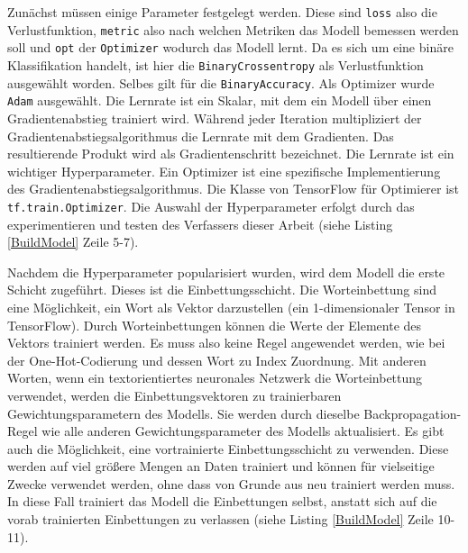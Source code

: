 Zunächst müssen einige Parameter festgelegt werden. Diese sind \texttt{loss} also die Verlustfunktion, \texttt{metric} also nach welchen Metriken das Modell bemessen werden soll und \texttt{opt} der \texttt{Optimizer} wodurch das Modell lernt. Da es sich um eine binäre Klassifikation handelt, ist hier die \texttt{BinaryCrossentropy} als Verlustfunktion ausgewählt worden. Selbes gilt für die \texttt{BinaryAccuracy}. Als Optimizer wurde \texttt{Adam} ausgewählt. Die Lernrate ist ein Skalar, mit dem ein Modell über einen Gradientenabstieg trainiert wird. Während jeder Iteration multipliziert der Gradientenabstiegsalgorithmus die Lernrate mit dem Gradienten. Das resultierende Produkt wird als Gradientenschritt bezeichnet. Die Lernrate ist ein wichtiger Hyperparameter. Ein Optimizer ist eine spezifische Implementierung des Gradientenabstiegsalgorithmus. Die Klasse von TensorFlow für Optimierer ist \texttt{tf.train.Optimizer}. Die Auswahl der Hyperparameter erfolgt durch das experimentieren und testen des Verfassers dieser Arbeit (siehe Listing \ref{BuildModel} Zeile 5-7).

Nachdem die Hyperparameter popularisiert wurden, wird dem Modell die erste Schicht zugeführt. Dieses ist die Einbettungsschicht. Die Worteinbettung sind eine Möglichkeit, ein Wort als Vektor darzustellen (ein 1-dimensionaler Tensor in TensorFlow). Durch Worteinbettungen können die Werte der Elemente des Vektors trainiert werden. Es muss also keine Regel angewendet werden, wie bei der One-Hot-Codierung und dessen Wort zu Index Zuordnung. Mit anderen Worten, wenn ein textorientiertes neuronales Netzwerk die Worteinbettung verwendet, werden die Einbettungsvektoren zu trainierbaren Gewichtungsparametern des Modells. Sie werden durch dieselbe Backpropagation-Regel wie alle anderen Gewichtungsparameter des Modells aktualisiert. Es gibt auch die Möglichkeit, eine vortrainierte Einbettungsschicht zu verwenden. Diese werden auf viel größere Mengen an Daten trainiert und können für vielseitige Zwecke verwendet werden, ohne dass von Grunde aus neu trainiert werden muss. In diese Fall trainiert das Modell die Einbettungen selbst, anstatt sich auf die vorab trainierten Einbettungen zu verlassen (siehe Listing \ref{BuildModel} Zeile 10-11).


